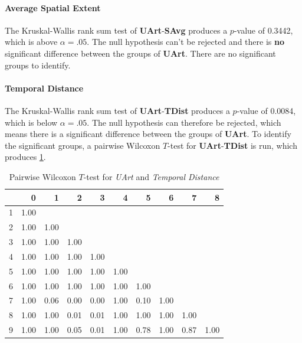 \paragraph{Average Spatial Extent}
The Kruskal-Wallis rank sum test of \textbf{UArt}-\textbf{SAvg} produces a $p$-value of 0.3442, which is above $\alpha=.05$. The null hypothesis can't be rejected and there is \textbf{no} significant difference between the groups of \textbf{UArt}. There are no significant groups to identify.

\paragraph{Temporal Distance}
The Kruskal-Wallis rank sum test of \textbf{UArt}-\textbf{TDist} produces a $p$-value of 0.0084, which is below $\alpha=.05$. The null hypothesis can therefore be rejected, which means there is a significant difference between the groups of \textbf{UArt}. To identify the significant groups, a pairwise Wilcoxon $T$-test for \textbf{UArt}-\textbf{TDist} is run, which produces \cref{tbl:wilcoxon_baysis_initiator_UArt_TDist}. 
\begin{table}[ht]
	\tiny
	\centering
    \begin{tabular}{rrrrrrrrrr}
        \toprule
        & 0 & 1 & 2 & 3 & 4 & 5 & 6 & 7 & 8 \\ 
        \midrule
        1 & 1.00 &  &  &  &  &  &  &  &  \\ 
        2 & 1.00 & 1.00 &  &  &  &  &  &  &  \\ 
        3 & 1.00 & 1.00 & 1.00 &  &  &  &  &  &  \\ 
        4 & 1.00 & 1.00 & 1.00 & 1.00 &  &  &  &  &  \\ 
        5 & 1.00 & 1.00 & 1.00 & 1.00 & 1.00 &  &  &  &  \\ 
        6 & 1.00 & 1.00 & 1.00 & 1.00 & 1.00 & 1.00 &  &  &  \\ 
        7 & 1.00 & 0.06 & 0.00 & 0.00 & 1.00 & 0.10 & 1.00 &  &  \\ 
        8 & 1.00 & 1.00 & 0.01 & 0.01 & 1.00 & 1.00 & 1.00 & 1.00 &  \\ 
        9 & 1.00 & 1.00 & 0.05 & 0.01 & 1.00 & 0.78 & 1.00 & 0.87 & 1.00 \\ 
        \bottomrule
      \end{tabular}
    \caption{Pairwise Wilcoxon $T$-test for \textit{UArt} and \textit{Temporal Distance}}
    \label{tbl:wilcoxon_baysis_initiator_UArt_TDist}
\end{table}
